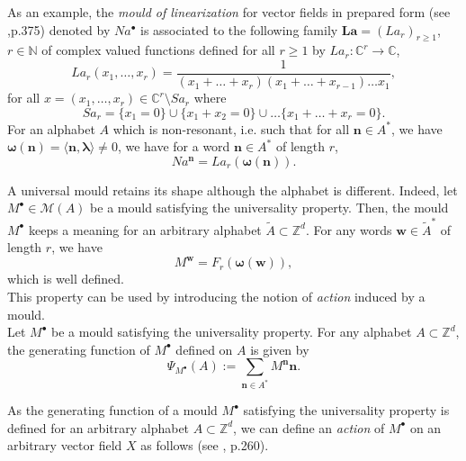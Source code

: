 \documentclass[english,11pt]{amsart}
\def\nn{\mathbf{n}}
\def\ww{\mathbf{w}}
\def\C{\mathbb{C}}
\def\Z{\mathbb{Z}}
\def\N{\mathbb{N}}
\def\di{\displaystyle}
\def\nn{\mathbf{n}}
\def\oo{\boldsymbol\omega}
\begin{document}
As an example, the {\it mould of linearization} for vector fields in prepared form (see \cite{cr2},p.375) denoted by $Na^{\bullet}$ is associated to the following family $\mathbf{La}=(La_r)_{r\geq 1}$, $r\in \N$ of complex valued functions defined for all $r\geq 1$ by $La_r : \C^r \rightarrow \C$, 
\begin{equation}
    La_r (x_1 ,\dots ,x_r ) =\di\frac{1}{(x_1 +\dots +x_r ) (x_1 +\dots +x_{r-1} ) \dots x_1} ,
\end{equation}
for all $x=(x_1 ,\dots ,x_r ) \in \C^r \setminus Sa_r$ where 
\begin{equation}
    Sa_r =\{ x_1 =0\} \cup \{ x_1 +x_2 =0\} \cup \dots \{ x_1 +\dots +x_r =0\} .
\end{equation}
For an alphabet $A$ which is non-resonant, i.e. such that for all $\nn \in A^*$, we have $\oo (\nn )=\langle \nn ,\mathbf{\lambda} \rangle \neq 0$, we have for a word $\nn \in A^*$ of length $r$, 
\begin{equation}
    Na^{\nn} =La_r (\oo (\nn ) ) . 
\end{equation}

A universal mould retains its shape although the alphabet is different. Indeed, let $M^{\bullet} \in \mathscr{M} (A)$ be a mould satisfying the universality property. Then, the mould $M^{\bullet}$ keeps a meaning for an arbitrary alphabet $\tilde{A} \subset \Z^d$. For any words $\ww \in \tilde{A}^*$ of length $r$, we have 
\begin{equation}
    M^{\ww} =F_r (\oo (\ww ) ) ,
\end{equation}
which is well defined.\\

This property can be used by introducing the notion of {\it action} induced by a mould.\\

Let $M^{\bullet}$ be a mould satisfying the universality property. For any alphabet $A \subset \Z^d$, the generating function of $M^{\bullet}$ defined on $A$ is given by
\begin{equation}
    \Psi_{M^{\bullet}} (A):=\di\sum_{\nn \in A^*} M^{\nn } \nn .
\end{equation}

As the generating function of a mould $M^{\bullet}$ satisfying the universality property is defined for an arbitrary alphabet $A\subset \Z^d$, we can define an {\it action} of $M^{\bullet}$ on an arbitrary vector field $X$ as follows (see \cite{ev}, p.260).\\
\end{document}
